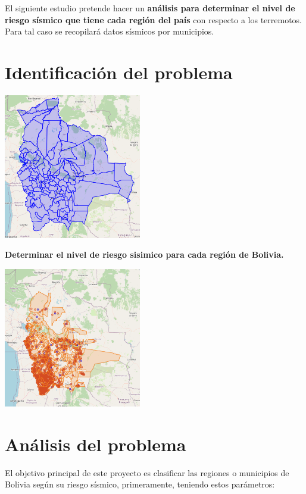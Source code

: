 \documentclass[12pt]{article}
\begin{document}
El siguiente estudio pretende hacer un \textbf{análisis para determinar el nivel de riesgo sísmico que tiene cada región del país} con respecto a los terremotos. Para tal caso se recopilará datos sísmicos por municipios.


\section{Identificación del problema}

\begin{center}
  \includegraphics[width=6cm]{bolivia_regiones}
\end{center}


\textbf{Determinar el nivel de riesgo sisimico para cada región de Bolivia.}


\begin{center}
  \includegraphics[width=6cm]{bolivia_eq1}
\end{center}


\section{Análisis del problema}

El objetivo principal de este proyecto es clasificar las regiones o municipios de Bolivia según su riesgo sísmico, primeramente, teniendo estos parámetros:
\end{document}
